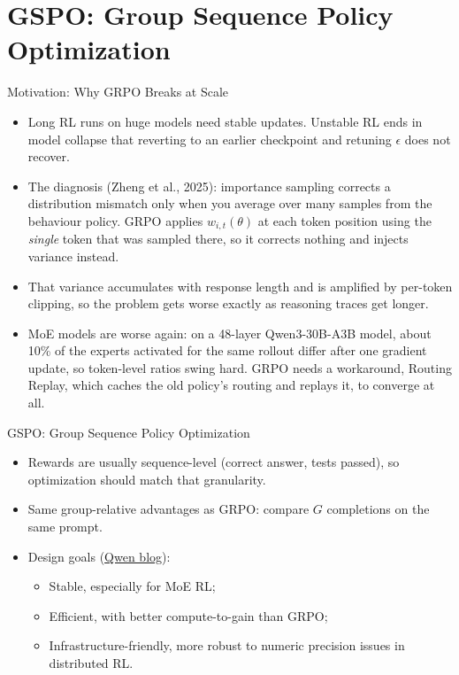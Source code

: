 \section{GSPO: Group Sequence Policy Optimization}

\begin{frame}{Motivation: Why GRPO Breaks at Scale}
    \begin{itemize}\itemsep0.3em
      \item[\textcolor{red}{$\blacktriangleright$}] Long RL runs on huge models need stable updates. Unstable RL ends in model collapse that reverting to an earlier checkpoint and retuning $\epsilon$ does not recover.
      \item[\textcolor{red}{$\blacktriangleright$}] The diagnosis (Zheng et al., 2025): importance sampling corrects a distribution mismatch only when you average over many samples from the behaviour policy. GRPO applies $w_{i,t}(\theta)$ at each token position using the \emph{single} token that was sampled there, so it corrects nothing and injects variance instead.
      \item[\textcolor{red}{$\blacktriangleright$}] That variance accumulates with response length and is amplified by per-token clipping, so the problem gets worse exactly as reasoning traces get longer.
      \item[\textcolor{red}{$\blacktriangleright$}] MoE models are worse again: on a 48-layer Qwen3-30B-A3B model, about 10\% of the experts activated for the same rollout differ after one gradient update, so token-level ratios swing hard. GRPO needs a workaround, Routing Replay, which caches the old policy's routing and replays it, to converge at all.
    \end{itemize}
\end{frame}

\begin{frame}{GSPO: Group Sequence Policy Optimization}
  \begin{itemize}\itemsep0.4em
    \item[\textcolor{red}{$\blacktriangleright$}] Rewards are usually sequence-level (correct answer, tests passed), so optimization should match that granularity.
    \item[\textcolor{red}{$\blacktriangleright$}] Same group-relative advantages as GRPO: compare $G$ completions on the same prompt.
    \item[\textcolor{red}{$\blacktriangleright$}] Design goals (\href{https://qwen.ai/blog?id=gspo}{Qwen blog}):
    \begin{itemize}\itemsep0.2em
      \item Stable, especially for MoE RL;
      \item Efficient, with better compute-to-gain than GRPO;
      \item Infrastructure-friendly, more robust to numeric precision issues in distributed RL.
    \end{itemize}
  \end{itemize}
\end{frame}

